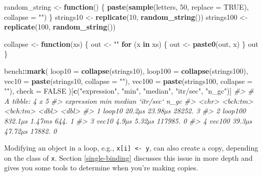 \documentclass[]{book}
\newenvironment{Shaded}{\begin{snugshade}}{\end{snugshade}}
\newcommand{\CommentTok}[1]{\textcolor[rgb]{0.37,0.37,0.37}{\textit{#1}}}
\newcommand{\ControlFlowTok}[1]{\textcolor[rgb]{0.27,0.27,0.27}{\textbf{#1}}}
\newcommand{\DataTypeTok}[1]{\textcolor[rgb]{0.27,0.27,0.27}{#1}}
\newcommand{\DecValTok}[1]{\textcolor[rgb]{0.06,0.06,0.06}{#1}}
\newcommand{\KeywordTok}[1]{\textcolor[rgb]{0.27,0.27,0.27}{\textbf{#1}}}
\newcommand{\NormalTok}[1]{#1}
\newcommand{\OperatorTok}[1]{\textcolor[rgb]{0.43,0.43,0.43}{\textbf{#1}}}
\newcommand{\OtherTok}[1]{\textcolor[rgb]{0.37,0.37,0.37}{#1}}
\newcommand{\StringTok}[1]{\textcolor[rgb]{0.5,0.5,0.5}{#1}}
\begin{document}
\begin{Shaded}
\begin{Highlighting}[]
\NormalTok{random_string <-}\StringTok{ }\ControlFlowTok{function}\NormalTok{() \{}
  \KeywordTok{paste}\NormalTok{(}\KeywordTok{sample}\NormalTok{(letters, }\DecValTok{50}\NormalTok{, }\DataTypeTok{replace =} \OtherTok{TRUE}\NormalTok{), }\DataTypeTok{collapse =} \StringTok{""}\NormalTok{)}
\NormalTok{\}}
\NormalTok{strings10 <-}\StringTok{ }\KeywordTok{replicate}\NormalTok{(}\DecValTok{10}\NormalTok{, }\KeywordTok{random_string}\NormalTok{())}
\NormalTok{strings100 <-}\StringTok{ }\KeywordTok{replicate}\NormalTok{(}\DecValTok{100}\NormalTok{, }\KeywordTok{random_string}\NormalTok{())}

\NormalTok{collapse <-}\StringTok{ }\ControlFlowTok{function}\NormalTok{(xs) \{}
\NormalTok{  out <-}\StringTok{ ""}
  \ControlFlowTok{for}\NormalTok{ (x }\ControlFlowTok{in}\NormalTok{ xs) \{}
\NormalTok{    out <-}\StringTok{ }\KeywordTok{paste0}\NormalTok{(out, x)}
\NormalTok{  \}}
\NormalTok{  out}
\NormalTok{\}}

\NormalTok{bench}\OperatorTok{::}\KeywordTok{mark}\NormalTok{(}
  \DataTypeTok{loop10  =} \KeywordTok{collapse}\NormalTok{(strings10),}
  \DataTypeTok{loop100 =} \KeywordTok{collapse}\NormalTok{(strings100),}
  \DataTypeTok{vec10   =} \KeywordTok{paste}\NormalTok{(strings10, }\DataTypeTok{collapse =} \StringTok{""}\NormalTok{),}
  \DataTypeTok{vec100  =} \KeywordTok{paste}\NormalTok{(strings100, }\DataTypeTok{collapse =} \StringTok{""}\NormalTok{),}
  \DataTypeTok{check =} \OtherTok{FALSE}
\NormalTok{)[}\KeywordTok{c}\NormalTok{(}\StringTok{"expression"}\NormalTok{, }\StringTok{"min"}\NormalTok{, }\StringTok{"median"}\NormalTok{, }\StringTok{"itr/sec"}\NormalTok{, }\StringTok{"n_gc"}\NormalTok{)]}
\CommentTok{#> # A tibble: 4 x 5}
\CommentTok{#>   expression      min   median `itr/sec`  n_gc}
\CommentTok{#>   <chr>      <bch:tm> <bch:tm>     <dbl> <dbl>}
\CommentTok{#> 1 loop10       20.2µs  23.98µs    28252.     3}
\CommentTok{#> 2 loop100     832.1µs   1.47ms      644.     1}
\CommentTok{#> 3 vec10         4.9µs   5.32µs   117985.     0}
\CommentTok{#> 4 vec100       39.3µs  47.72µs    17882.     0}
\end{Highlighting}
\end{Shaded}

Modifying an object in a loop, e.g., \texttt{x{[}i{]}\ \textless{}-\ y}, can also create a copy, depending on the class of \texttt{x}. Section \ref{single-binding} discusses this issue in more depth and gives you some tools to determine when you're making copies.
\end{document}
